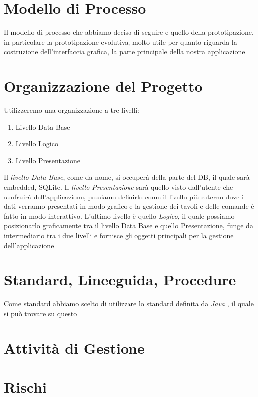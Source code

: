 \documentclass{book}
\begin{document}
\section{Modello di Processo}

Il modello di processo che abbiamo deciso di seguire e quello della prototipazione, in particolare la prototipazione evolutiva, molto utile per quanto riguarda la costruzione dell'interfaccia grafica, la parte principale della nostra applicazione

\section{Organizzazione del Progetto}

Utilizzeremo una organizzazione a tre livelli:

\begin{enumerate}
    \item Livello Data Base
    \item Livello Logico
    \item Livello Presentazione
\end{enumerate}

Il \textit{livello Data Base}, come da nome, si occuperà della parte del DB, il quale sarà embedded, SQLite.
Il \textit{livello Presentazione} sarà quello visto dall'utente che usufruirà dell'applicazione, possiamo definirlo come il livello più esterno dove i dati verranno presentati in modo grafico e la gestione dei tavoli e delle comande è fatto in modo interattivo.
L'ultimo livello è quello \textit{Logico}, il quale possiamo posizionarlo graficamente tra il livello Data Base e quello Presentazione, funge da intermediario tra i due livelli e fornisce gli oggetti principali per la gestione dell'applicazione


\section{Standard, Lineeguida, Procedure}

Come standard abbiamo scelto di utilizzare lo standard definita da \textit{Java} , il quale si può trovare su questo

\section{Attività di Gestione}

\section{Rischi}
\end{document}
